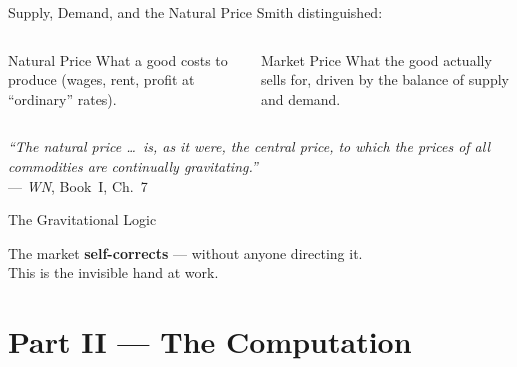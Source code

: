 \documentclass[aspectratio=169, 10pt]{beamer}
\begin{document}
\begin{frame}{Supply, Demand, and the Natural Price}
Smith distinguished:
\vspace{0.5em}
\begin{columns}[T]
\begin{block}{Natural Price}
  What a good costs to produce (wages, rent, profit at ``ordinary'' rates).
\end{block}
\begin{block}{Market Price}
  What the good actually sells for, driven by the balance of supply and demand.
\end{block}
\end{columns}
\vspace{1em}
\textit{``The natural price \ldots\ is, as it were, the central price,
to which the prices of all commodities are continually gravitating.''}\\[4pt]
\hfill--- \textit{WN}, Book~I, Ch.~7
\end{frame}

\begin{frame}{The Gravitational Logic}
\begin{center}
\end{center}
\vspace{0.5em}
The market \textbf{self-corrects} --- without anyone directing it.\\
This is the invisible hand at work.
\end{frame}

\section{Part II --- The Computation}
\end{document}
